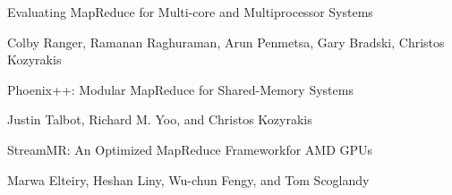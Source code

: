 \documentclass[11pt,a4paper,twocolumn] {scrartcl}   %
\begin{document}
\begin{thebibliography}{9}
  Evaluating MapReduce for Multi-core and Multiprocessor Systems

  Colby Ranger, Ramanan Raghuraman, Arun Penmetsa, Gary Bradski, Christos Kozyrakis

    Phoenix++: Modular MapReduce for Shared-Memory Systems

    Justin Talbot, Richard M. Yoo, and Christos Kozyrakis

    StreamMR: An Optimized MapReduce Frameworkfor AMD GPUs

    Marwa Elteiry, Heshan Liny, Wu-chun Fengy, and Tom Scoglandy

\thispagestyle{empty}
\pagestyle{empty}
\end{thebibliography}
\end{document}
